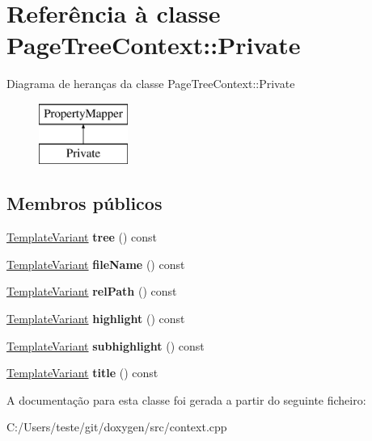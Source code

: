 \hypertarget{class_page_tree_context_1_1_private}{\section{Referência à classe Page\-Tree\-Context\-:\-:Private}
\label{class_page_tree_context_1_1_private}
}
Diagrama de heranças da classe Page\-Tree\-Context\-:\-:Private\begin{figure}[H]
\begin{center}
\leavevmode
\includegraphics[height=2.000000cm]{class_page_tree_context_1_1_private}
\end{center}
\end{figure}
\subsection*{Membros públicos}
\begin{DoxyCompactItemize}
\item 
\hypertarget{class_page_tree_context_1_1_private_a03a64bc77db8e7343cdb41781dc3f9a6}{\hyperlink{class_template_variant}{Template\-Variant} {\bfseries tree} () const }\label{class_page_tree_context_1_1_private_a03a64bc77db8e7343cdb41781dc3f9a6}

\item 
\hypertarget{class_page_tree_context_1_1_private_ae9e01c2e41d8bdd7446faf2a1ab28a44}{\hyperlink{class_template_variant}{Template\-Variant} {\bfseries file\-Name} () const }\label{class_page_tree_context_1_1_private_ae9e01c2e41d8bdd7446faf2a1ab28a44}

\item 
\hypertarget{class_page_tree_context_1_1_private_a68d3623b40481f2d31009257086699e4}{\hyperlink{class_template_variant}{Template\-Variant} {\bfseries rel\-Path} () const }\label{class_page_tree_context_1_1_private_a68d3623b40481f2d31009257086699e4}

\item 
\hypertarget{class_page_tree_context_1_1_private_ab088f4d955499ca1d67c286a117e5bfe}{\hyperlink{class_template_variant}{Template\-Variant} {\bfseries highlight} () const }\label{class_page_tree_context_1_1_private_ab088f4d955499ca1d67c286a117e5bfe}

\item 
\hypertarget{class_page_tree_context_1_1_private_ade53cb2b5272274e0736e78a27b75c5b}{\hyperlink{class_template_variant}{Template\-Variant} {\bfseries subhighlight} () const }\label{class_page_tree_context_1_1_private_ade53cb2b5272274e0736e78a27b75c5b}

\item 
\hypertarget{class_page_tree_context_1_1_private_a5732df72750a31555da8a10f5788ef02}{\hyperlink{class_template_variant}{Template\-Variant} {\bfseries title} () const }\label{class_page_tree_context_1_1_private_a5732df72750a31555da8a10f5788ef02}

\end{DoxyCompactItemize}


A documentação para esta classe foi gerada a partir do seguinte ficheiro\-:\begin{DoxyCompactItemize}
\item 
C\-:/\-Users/teste/git/doxygen/src/context.\-cpp\end{DoxyCompactItemize}
